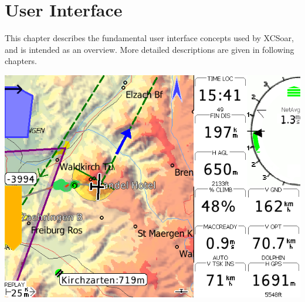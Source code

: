 \chapter{User Interface}\label{cha:interface}
This chapter describes the fundamental user interface concepts used by
XCSoar, and is intended as an overview.  More detailed descriptions
are given in following chapters.

\begin{center}
\includegraphics[angle=0,width=\linewidth,keepaspectratio='true']{figures/plain.png}
\end{center}

